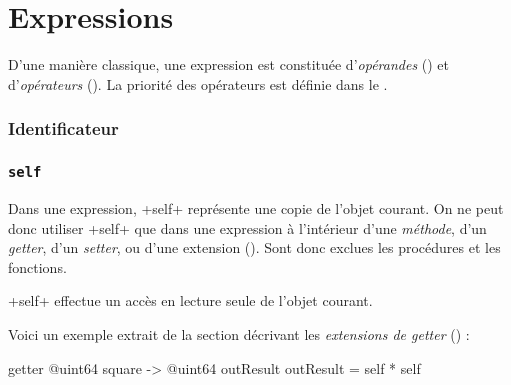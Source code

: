 
\chapter{Expressions}



D'une manière classique, une expression est constituée d'\emph{opérandes} () et d'\emph{opérateurs} (). La priorité des opérateurs est définie dans le .





\subsection{Identificateur}

\subsection{\texttt{self}}

Dans une expression, \ggst+self+ représente une copie de l'objet courant. On ne peut donc utiliser \ggst+self+ que dans une expression à l'intérieur d'une \emph{méthode}, d'un \emph{getter}, d'un \emph{setter}, ou d'une extension (). Sont donc exclues les procédures et les fonctions.

\ggst+self+ effectue un accès en lecture seule de l'objet courant.

Voici un exemple extrait de la section décrivant les \emph{extensions de getter} () :
\begin{galgas3}
getter @uint64 square -> @uint64 outResult {
  outResult = self * self
}
\end{galgas3}









